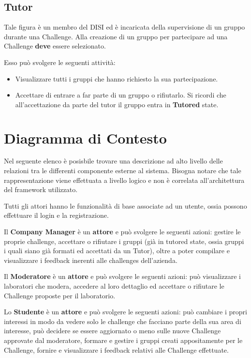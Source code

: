 \subsection{Tutor}
Tale figura è un membro del DISI ed è incaricata della supervisione di un gruppo durante una Challenge. Alla creazione di un gruppo per partecipare ad una Challenge \textbf{deve} essere selezionato. 

Esso può svolgere le seguenti attività:
\begin{itemize}
    \item Visualizzare tutti i gruppi che hanno richiesto la sua partecipazione. 
    \item Accettare di entrare a far parte di un gruppo o rifiutarlo. Si ricordi che all'accettazione da parte del tutor il gruppo entra in \textbf{Tutored }state. 
\end{itemize}

\section{Diagramma di Contesto}

Nel seguente elenco è posisbile trovare una descrizione ad alto livello delle relazioni tra le differenti componente esterne al sistema. Bisogna notare che tale rappresentazione viene effettuata a livello logico e non è correlata all'architettura del framework utilizzato.

Tutti gli attori hanno le funzionalità di base associate ad un utente, ossia possono effettuare il login e la registrazione. 

Il \textbf{Company Manager} è un \textbf{attore} e può svolgere le seguenti azioni: gestire le proprie challenge, accettare o rifiutare i gruppi (già in tutored state, ossia gruppi i quali siano già formati ed accettati da un Tutor), oltre a poter compilare e visualizzare i feedback inerenti alle challenges dell'azienda.

Il \textbf{Moderatore} è un \textbf{attore} e può svolgere le seguenti azioni: può visualizzare i laboratori che modera, accedere al loro dettaglio ed accettare o rifiutare le Challenge proposte per il laboratorio.

Lo \textbf{Studente} è un \textbf{attore} e può svolgere le seguenti azioni: può cambiare i propri interessi in modo da vedere solo le challenge che facciano parte della sua area di interesse, può decidere se essere aggiornato o meno sulle nuove Challenge approvate dal moderatore, formare e gestire i gruppi creati appositamente per le Challenge, fornire e visualizzare i feedback relativi alle Challenge effettuate.

